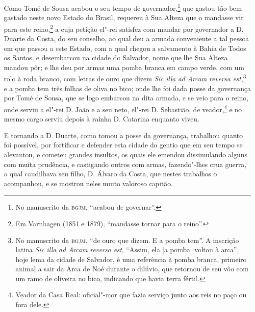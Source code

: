 Como Tomé de Sousa acabou o seu tempo de governador,\footnote{ No manuscrito da
\textsc{bgjm}, ``acabou de governar''.} que gastou tão bem gastado neste novo Estado do
Brasil, requereu à Sua Alteza que o mandasse vir para este reino,\footnote{ Em Varnhagen
(1851 e 1879), ``mandasse tornar para o reino''.} a cuja petição el"-rei satisfez com
mandar por governador a D. Duarte da Costa, do seu conselho, ao qual deu a armada
conveniente a tal pessoa em que passou a este Estado, com a qual chegou a salvamento à
Bahia de Todos os Santos, e desembarcou na cidade do Salvador, nome que lhe Sua Alteza
mandou pôr; e lhe deu por armas uma pomba branca em campo verde, com um rolo à roda
branco, com letras de ouro que dizem \textit{Sic illa ad Arcam reversa est},\footnote{ No
manuscrito da \textsc{bgjm}, ``de ouro que dizem. E a pomba tem''. A inscrição latina
\textit{Sic illa ad Arcam reversa est}, ``Assim, ela [a pomba] voltou à arca'', hoje lema
da cidade de Salvador, é uma referência à pomba branca, primeiro animal a sair da Arca de
Noé durante o dilúvio, que retornou de seu vôo com um ramo de oliveira no bico, indicando
que havia terra fértil. } e a pomba tem três folhas de oliva no bico; onde lhe foi dada
posse da governança por Tomé de Sousa, que se logo embarcou na dita armada, e se veio para
o reino, onde serviu a el"-rei D. João e a seu neto, el"-rei D. Sebastião, de
veador,\footnote{ Veador da Casa Real: oficial"-mor que fazia serviço junto aos reis no paço
ou fora dele.} e no mesmo cargo serviu depois à rainha D. Catarina enquanto viveu.

E tornando a D. Duarte, como tomou a posse da governança, trabalhou quanto foi possível,
por fortificar e defender esta cidade do gentio que em seu tempo se alevantou, e cometeu
grandes insultos, os quais ele emendou dissimulando alguns com muita prudência, e
castigando outros com armas, fazendo"-lhes crua guerra, a qual caudilhava seu filho, D.
Álvaro da Costa, que nestes trabalhos o acompanhou, e se mostrou neles muito valoroso
capitão.


